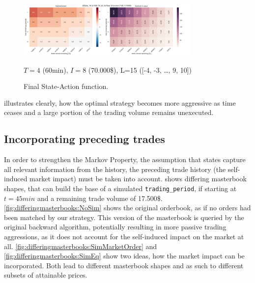 \begin{figure}[ht]
	\centering
   \includegraphics[width=0.8\textwidth]{content/drawings/heatmap_3months}
	\caption{Final State-Action function.}
	$T=4$ (60min), $I=8$ (70.000\$), L=15 ([-4, -3, \ldots{}, 9, 10])
	\label{fig:heatmap}
\end{figure}

 illustrates clearly, how the optimal strategy becomes more aggressive as time ceases and a large portion of the trading volume remains unexecuted.\\

\subsection{Incorporating preceding trades}
\label{chap:backwardapproach:precedingTrades}
In order to strengthen the Markov Property, \ie the assumption that states capture all relevant information from the history, the preceding trade history  (\ie the self-induced market impact) must be taken into account.  shows differing masterbook shapes, that can build the base of a simulated \lstinline!trading_period!, \eg if starting at $t=45min$ and a remaining trade volume of 17.500\$. \ref{fig:differingmasterbooks:NoSim} shows the original orderbook, as if no orders had been matched by our strategy. This version of the masterbook is queried by the original backward algorithm, potentially resulting in more passive trading aggressions, as it does not account for the self-induced impact on the market at all. \ref{fig:differingmasterbooks:SimMarketOrder} and \ref{fig:differingmasterbooks:SimEq} show two ideas, how the market impact can be incorporated. Both lead to different masterbook shapes and as such to different subsets of attainable prices.\\

